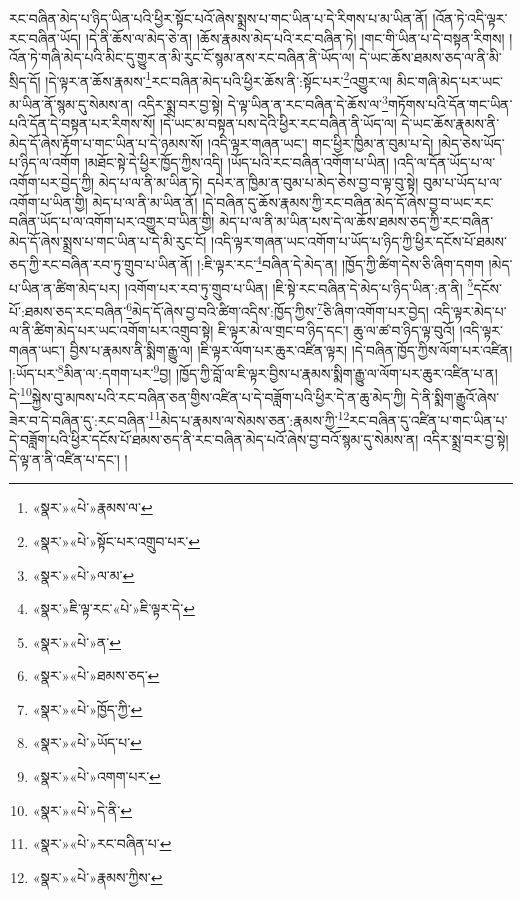 རང་བཞིན་མེད་པ་ཉིད་ཡིན་པའི་ཕྱིར་སྟོང་པའོ་ཞེས་སྨྲས་པ་གང་ཡིན་པ་དེ་རིགས་པ་མ་ཡིན་ནོ། །འོན་ཏེ་འདི་ལྟར་རང་བཞིན་ཡོད། །དེ་ནི་ཆོས་ལ་མེད་ཅེ་ན། །ཆོས་རྣམས་མེད་པའི་རང་བཞིན་ཏེ། །གང་གི་ཡིན་པ་དེ་བསྟན་རིགས། །འོན་ཏེ་གཞི་མེད་པའི་མིང་དུ་གྱུར་ན་མི་རུང་ངོ་སྙམ་ནས་རང་བཞིན་ནི་ཡོད་ལ། དེ་ཡང་ཆོས་ཐམས་ཅད་ལ་ནི་མི་སྲིད་དོ། །དེ་ལྟར་ན་ཆོས་རྣམས་\footnote{«སྣར་»«པེ་»རྣམས་ལ་}རང་བཞིན་མེད་པའི་ཕྱིར་ཆོས་ནི་:སྟོང་པར་\footnote{«སྣར་»«པེ་»སྟོང་པར་འགྲུབ་པར་}འགྱུར་ལ། མིང་གཞི་མེད་པར་ཡང་མ་ཡིན་ནོ་སྙམ་དུ་སེམས་ན། འདིར་སྨྲ་བར་བྱ་སྟེ། དེ་ལྟ་ཡིན་ན་རང་བཞིན་དེ་ཆོས་ལ་\footnote{«སྣར་»«པེ་»ལ་མ་}གཏོགས་པའི་དོན་གང་ཡིན་པའི་དོན་དེ་བསྟན་པར་རིགས་སོ། །དེ་ཡང་མ་བསྟན་པས་དེའི་ཕྱིར་རང་བཞིན་ནི་ཡོད་ལ། དེ་ཡང་ཆོས་རྣམས་ནི་མེད་དོ་ཞེས་རྟོག་པ་གང་ཡིན་པ་དེ་ཉམས་སོ། །འདི་ལྟར་གཞན་ཡང་། གང་ཕྱིར་ཁྱིམ་ན་བུམ་པ་དེ། །མེད་ཅེས་ཡོད་པ་ཉིད་ལ་འགོག །མཐོང་སྟེ་དེ་ཕྱིར་ཁྱོད་ཀྱིས་འདི། །ཡོད་པའི་རང་བཞིན་འགོག་པ་ཡིན། །འདི་ལ་དོན་ཡོད་པ་ལ་འགོག་པར་བྱེད་ཀྱི། མེད་པ་ལ་ནི་མ་ཡིན་ཏེ། དཔེར་ན་ཁྱིམ་ན་བུམ་པ་མེད་ཅེས་བྱ་བ་ལྟ་བུ་སྟེ། བུམ་པ་ཡོད་པ་ལ་འགོག་པ་ཡིན་གྱི། མེད་པ་ལ་ནི་མ་ཡིན་ནོ། །དེ་བཞིན་དུ་ཆོས་རྣམས་ཀྱི་རང་བཞིན་མེད་དོ་ཞེས་བྱ་བ་ཡང་རང་བཞིན་ཡོད་པ་ལ་འགོག་པར་འགྱུར་བ་ཡིན་གྱི། མེད་པ་ལ་ནི་མ་ཡིན་པས་དེ་ལ་ཆོས་ཐམས་ཅད་ཀྱི་རང་བཞིན་མེད་དོ་ཞེས་སྨྲས་པ་གང་ཡིན་པ་དེ་མི་རུང་ངོ། །འདི་ལྟར་གཞན་ཡང་འགོག་པ་ཡོད་པ་ཉིད་ཀྱི་ཕྱིར་དངོས་པོ་ཐམས་ཅད་ཀྱི་རང་བཞིན་རབ་ཏུ་གྲུབ་པ་ཡིན་ནོ། །:ཇི་ལྟར་རང་\footnote{«སྣར་»ཇི་ལྟ་རང་«པེ་»ཇི་ལྟར་དེ་}བཞིན་དེ་མེད་ན། །ཁྱོད་ཀྱི་ཚིག་དེས་ཅི་ཞིག་དགག །མེད་པ་ཡིན་ན་ཚིག་མེད་པར། །འགོག་པར་རབ་ཏུ་གྲུབ་པ་ཡིན། །ཇི་སྟེ་རང་བཞིན་དེ་མེད་པ་ཉིད་ཡིན་:ན་ནི། \footnote{«སྣར་»«པེ་»ན་}དངོས་པོ་:ཐམས་ཅད་རང་བཞིན་\footnote{«སྣར་»«པེ་»ཐམས་ཅད་}མེད་དོ་ཞེས་བྱ་བའི་ཚིག་འདིས་:ཁྱོད་ཀྱིས་\footnote{«སྣར་»«པེ་»ཁྱོད་ཀྱི་}ཅི་ཞིག་འགོག་པར་བྱེད། འདི་ལྟར་མེད་པ་ལ་ནི་ཚིག་མེད་པར་ཡང་འགོག་པར་འགྲུབ་སྟེ། ཇི་ལྟར་མེ་ལ་གྲང་བ་ཉིད་དང་། ཆུ་ལ་ཚ་བ་ཉིད་ལྟ་བུའོ། །འདི་ལྟར་གཞན་ཡང་། བྱིས་པ་རྣམས་ནི་སྨིག་རྒྱུ་ལ། །ཇི་ལྟར་ལོག་པར་ཆུར་འཛིན་ལྟར། །དེ་བཞིན་ཁྱོད་ཀྱིས་ལོག་པར་འཛིན། །:ཡོད་པར་\footnote{«སྣར་»«པེ་»ཡོད་པ་}མིན་ལ་:དགག་པར་\footnote{«སྣར་»«པེ་»འགག་པར་}བྱ། །ཁྱོད་ཀྱི་བློ་ལ་ཇི་ལྟར་བྱིས་པ་རྣམས་སྨིག་རྒྱུ་ལ་ལོག་པར་ཆུར་འཛིན་པ་ན། དེ་\footnote{«སྣར་»«པེ་»དེ་ནི་}སྐྱེས་བུ་མཁས་པའི་རང་བཞིན་ཅན་གྱིས་འཛིན་པ་དེ་བཟློག་པའི་ཕྱིར་དེ་ན་ཆུ་མེད་ཀྱི། དེ་ནི་སྨིག་རྒྱུའོ་ཞེས་ཟེར་བ་དེ་བཞིན་དུ་:རང་བཞིན་\footnote{«སྣར་»«པེ་»རང་བཞིན་པ་}མེད་པ་རྣམས་ལ་སེམས་ཅན་:རྣམས་ཀྱི་\footnote{«སྣར་»«པེ་»རྣམས་ཀྱིས་}རང་བཞིན་དུ་འཛིན་པ་གང་ཡིན་པ་དེ་བཟློག་པའི་ཕྱིར་དངོས་པོ་ཐམས་ཅད་ནི་རང་བཞིན་མེད་པའོ་ཞེས་བྱ་བའོ་སྙམ་དུ་སེམས་ན། འདིར་སྨྲ་བར་བྱ་སྟེ། དེ་ལྟ་ན་ནི་འཛིན་པ་དང་། །
